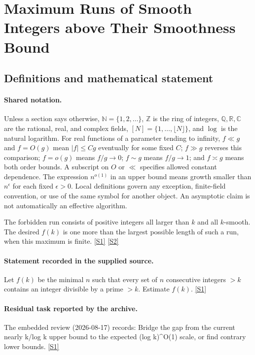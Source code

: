 \documentclass[11pt,a4paper]{article}
\newcommand{\N}{\mathbb{N}}
\newcommand{\Z}{\mathbb{Z}}
\newcommand{\Q}{\mathbb{Q}}
\newcommand{\R}{\mathbb{R}}
\newcommand{\C}{\mathbb{C}}
\newcommand{\sref}[2]{\hyperlink{source:#1:#2}{[S#2]}}
\begin{document}
\section{Maximum Runs of Smooth Integers above Their Smoothness Bound}\label{statement}


\subsection{Definitions and mathematical statement}

\paragraph{Shared notation.}Unless a section says otherwise, $\N=\{1,2,\ldots\}$,
$\Z$ is the ring of integers, $\Q,\R,\C$ are the rational, real, and complex
fields, $[N]=\{1,\ldots,\lfloor N\rfloor\}$, and $\log$ is the natural
logarithm. For real functions of a parameter tending to infinity,
$f\ll g$ and $f=O(g)$ mean $|f|\leq Cg$ eventually for some fixed $C$;
$f\gg g$ reverses this comparison; $f=o(g)$ means $f/g\to0$;
$f\sim g$ means $f/g\to1$; and $f\asymp g$ means both order bounds.
A subscript on $O$ or $\ll$ specifies allowed constant dependence.
The expression $n^{o(1)}$ in an upper bound means growth smaller than
$n^\epsilon$ for each fixed $\epsilon>0$. Local definitions govern any
exception, finite-field convention, or use of the same symbol for another
object. An asymptotic claim is not automatically an effective algorithm.



The forbidden run consists of positive integers all larger than $k$ and all $k$-smooth. The desired $f(k)$ is one more than the largest possible length of such a run, when this maximum is finite. \sref{statement}{1} \sref{statement}{2}

\paragraph{Statement recorded in the supplied source.}
Let $f(k)$ be the minimal $n$ such that every set of $n$ consecutive integers $>k$ contains an integer divisible by a prime $>k$. Estimate $f(k)$. \sref{statement}{1}

\paragraph{Residual task reported by the archive.}

The embedded review (2026-08-17) records: Bridge the gap from the current nearly k/log k upper bound to the expected (log k)\textasciicircum{}O(1) scale, or find contrary lower bounds. \sref{statement}{1}
\end{document}
